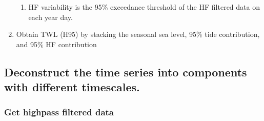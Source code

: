 \documentclass[letterpaper,10pt,english]{jupyterBook}
\begin{document}
\begin{enumerate}
\begin{enumerate}
\item {} 
\sphinxAtStartPar
HF variability is the 95\% exceedance threshold of the HF filtered data on each year day.

\end{enumerate}

\item {} 
\sphinxAtStartPar
Obtain TWL (H95) by stacking the seasonal sea level, 95\% tide contribution, and 95\% HF contribution

\end{enumerate}


\subsection{Deconstruct the time series into components with different timescales.}
\label{\detokenize{notebooks/regional_and_local/SL_Components_intra-annual:deconstruct-the-time-series-into-components-with-different-timescales}}

\subsubsection{Get high\sphinxhyphen{}pass filtered data}
\label{\detokenize{notebooks/regional_and_local/SL_Components_intra-annual:get-high-pass-filtered-data}}
\end{document}
